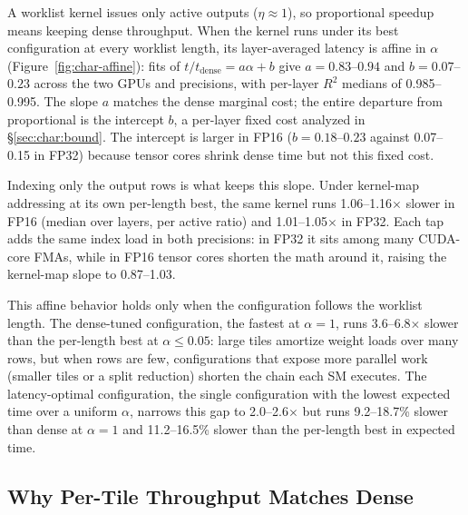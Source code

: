 A worklist kernel issues only active outputs ($\eta \approx 1$), so
proportional speedup means keeping dense throughput. When the kernel runs under
its best configuration at every worklist length, its layer-averaged latency is
affine in $\alpha$ (Figure~\ref{fig:char-affine}): fits of
$t/t_{\mathrm{dense}} = a\alpha + b$ give $a = 0.83$--$0.94$ and
$b = 0.07$--$0.23$ across the two GPUs and precisions, with per-layer $R^2$
medians of 0.985--0.995. The slope $a$ matches the dense marginal cost; the
entire departure from proportional is the intercept $b$, a per-layer fixed
cost analyzed in \S\ref{sec:char:bound}. The intercept is larger in FP16
($b = 0.18$--$0.23$ against 0.07--0.15 in FP32) because tensor cores shrink dense time but not this fixed cost.

Indexing only the output rows is what keeps this slope. Under kernel-map
addressing at its own per-length best, the same kernel runs
1.06--1.16$\times$ slower in FP16 (median over layers, per active ratio) and
1.01--1.05$\times$ in FP32. Each tap adds the same index load in both
precisions: in FP32 it sits among many CUDA-core FMAs, while in FP16 tensor
cores shorten the math around it, raising the kernel-map slope to 0.87--1.03.

This affine behavior holds only when the configuration follows the worklist
length. The dense-tuned configuration, the fastest at $\alpha = 1$, runs
3.6--6.8$\times$ slower than the per-length best at $\alpha \le 0.05$: large
tiles amortize weight loads over many rows, but when rows are few,
configurations that expose more parallel work (smaller tiles or a split
reduction) shorten the chain each SM executes. The latency-optimal
configuration, the single configuration with the lowest expected time over a
uniform $\alpha$, narrows this gap to 2.0--2.6$\times$ but runs
9.2--18.7\% slower than dense at $\alpha = 1$ and 11.2--16.5\% slower than
the per-length best in expected time.


\subsection{Why Per-Tile Throughput Matches Dense}
\label{sec:char:reduction}

